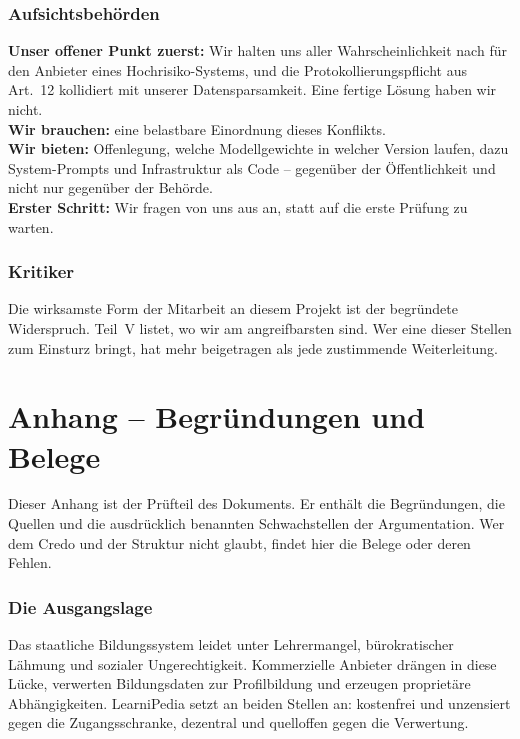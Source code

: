 \documentclass[11pt,a4paper]{article}
\begin{document}
\section{Aufsichtsbehörden}
\textbf{Unser offener Punkt zuerst:} Wir halten uns aller Wahrscheinlichkeit nach für den Anbieter eines Hochrisiko-Systems, und die Protokollierungspflicht aus Art.~12 kollidiert mit unserer Datensparsamkeit. Eine fertige Lösung haben wir nicht.\\
\textbf{Wir brauchen:} eine belastbare Einordnung dieses Konflikts.\\
\textbf{Wir bieten:} Offenlegung, welche Modellgewichte in welcher Version laufen, dazu System-Prompts und Infrastruktur als Code -- gegenüber der Öffentlichkeit und nicht nur gegenüber der Behörde.\\
\textbf{Erster Schritt:} Wir fragen von uns aus an, statt auf die erste Prüfung zu warten.

\section{Kritiker}
Die wirksamste Form der Mitarbeit an diesem Projekt ist der begründete Widerspruch. Teil~V listet, wo wir am angreifbarsten sind. Wer eine dieser Stellen zum Einsturz bringt, hat mehr beigetragen als jede zustimmende Weiterleitung.

\part*{Anhang -- Begründungen und Belege}
\appendix
\setcounter{section}{0}
\renewcommand{\thesection}{A.\arabic{section}}
\renewcommand{\theHsection}{App.\arabic{section}}

\noindent Dieser Anhang ist der Prüfteil des Dokuments. Er enthält die Begründungen, die Quellen und die ausdrücklich benannten Schwachstellen der Argumentation. Wer dem Credo und der Struktur nicht glaubt, findet hier die Belege oder deren Fehlen.

\section{Die Ausgangslage}
Das staatliche Bildungssystem leidet unter Lehrermangel, bürokratischer Lähmung und sozialer Ungerechtigkeit. Kommerzielle Anbieter drängen in diese Lücke, verwerten Bildungsdaten zur Profilbildung und erzeugen proprietäre Abhängigkeiten. LearniPedia setzt an beiden Stellen an: kostenfrei und unzensiert gegen die Zugangsschranke, dezentral und quelloffen gegen die Verwertung.
\end{document}
